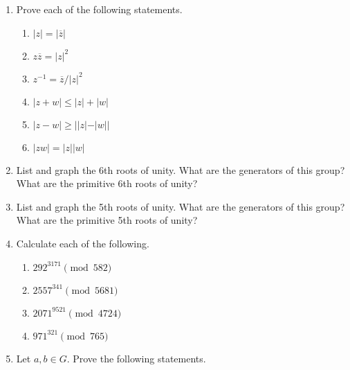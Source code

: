 {\begin{enumerate}
  
  \item
Prove each of the following statements.
\begin{multicols}{2}
\begin{enumerate}
 
 \item
$|z| = | \overline{z}|$

\item
$z \overline{z} = |z|^2$
 
 \item
$z^{-1} = \overline{z} / |z|^2$

 \item
$|z +w| \leq |z| + |w|$
 
 \item
$|z - w| \geq | |z| - |w||$
 
 \item
$|z w| = |z|  |w|$
 
\end{enumerate}
\end{multicols}


\item
List and graph the 6th roots of unity.  What are the generators of
this group?  What are the primitive 6th roots of unity?
 
 
\item
List and graph the 5th roots of unity.  What are the generators of
this group?  What are the primitive 5th roots of unity? 
 
 
  
\item
Calculate each of the following.
\begin{multicols}{2}
\begin{enumerate}
 
 \item
$292^{3171} \pmod{ 582}$

\item
$2557^{ 341} \pmod{ 5681}$

 \item
$2071^{ 9521} \pmod{ 4724}$
 
 \item
$971^{ 321} \pmod{ 765}$
 
\end{enumerate}
\end{multicols}
 
 
  
 
\item
Let $a, b \in G$.  Prove the following statements.
\begin{enumerate}
 

\end{enumerate}
\end{enumerate}}

